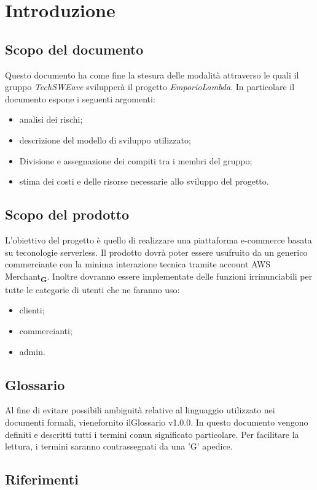 \section{Introduzione}
    \subsection{Scopo del documento}
    Questo documento ha come fine la stesura delle modalità attraverso le quali il gruppo \emph{TechSWEave} svilupperà il progetto \emph{EmporioLambda}. In particolare il documento espone i seguenti argomenti:
    \begin{itemize}
        \item analisi dei rischi;
        \item descrizione del modello di sviluppo utilizzato;
        \item Divisione e assegnazione dei compiti tra i membri del gruppo;
        \item stima dei costi e delle risorse necessarie allo sviluppo del progetto.
    \end{itemize}
    \subsection{Scopo del prodotto}
    L'obiettivo del progetto è quello di realizzare una piattaforma e-commerce basata su teconologie serverless. Il prodotto dovrà poter essere usufruito da un generico commerciante con la minima interazione tecnica tramite account AWS Merchant\textsubscript{\textbf{G}}. Inoltre dovranno essere implementate delle funzioni irrinunciabili per tutte le categorie di utenti che ne faranno uso:
    \begin{itemize}
        \item clienti;
        \item commercianti;
        \item admin.
    \end{itemize}
    \subsection{Glossario}
    Al fine di evitare possibili ambiguità relative al linguaggio utilizzato nei documenti formali, vienefornito ilGlossario v1.0.0. In questo documento vengono definiti e descritti tutti i termini conun significato particolare. Per facilitare la lettura, i termini saranno contrassegnati da una ’G’ apedice.
    \subsection{Riferimenti}
